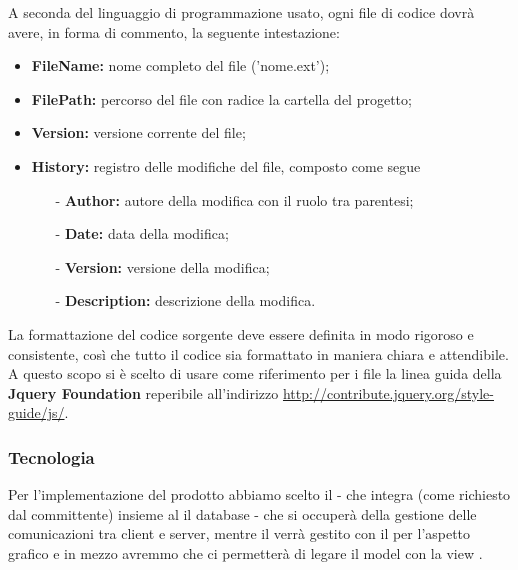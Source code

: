 \documentclass[a4paper,11pt]{article}
\begin{document}
			A seconda del linguaggio di programmazione usato, ogni file di codice dovrà avere, in forma di commento, la seguente intestazione:		
			
		\begin{itemize}
		\item \textbf{FileName:} nome completo del file ('nome.ext');
		\item \textbf{FilePath:} percorso del file con radice la cartella del progetto;
		\item \textbf{Version:} versione corrente del file;
		\item \textbf{History:} registro delle modifiche del file, composto come segue 
			\begin{itemize}
			\item[-] \textbf{Author:} autore della modifica con il ruolo tra parentesi;
			\item[-] \textbf{Date:} data della modifica;
			\item[-] \textbf{Version:} versione della modifica;
			\item[-] \textbf{Description:} descrizione della modifica.
			\end{itemize}	
		\end{itemize}
		
		La formattazione del codice sorgente deve essere definita in modo rigoroso e consistente, così
che tutto il codice sia formattato in maniera chiara e attendibile. A questo scopo si è scelto di usare come riferimento per i file   la linea guida della \textbf{Jquery Foundation} reperibile all'indirizzo \url{http://contribute.jquery.org/style-guide/js/}.
	
	\subsubsection{ Tecnologia}
	Per l'implementazione del prodotto abbiamo scelto il  - che integra  (come richiesto dal committente) insieme al il database  - che si occuperà della gestione delle comunicazioni tra client e server, mentre il  verrà gestito con il   per l'aspetto grafico e in mezzo avremmo   che ci permetterà di legare il model con la view .
	
\end{document}
